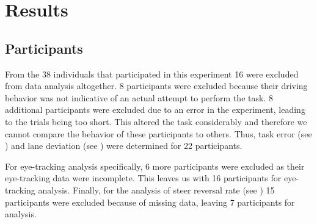 
\section{Results}\label{sec:results}
\subsection{Participants}
From the 38 individuals that participated in this experiment 16 were excluded from data analysis altogether.
8 participants were excluded because their driving behavior was not indicative of an actual attempt to perform the task.
8 additional participants were excluded due to an error in the experiment, leading to the trials being too short.
This altered the task considerably and therefore we cannot compare the behavior of these participants to others.
Thus, task error (see \citealp{DeMooij2021}) and lane deviation (see \citealp{Kelapanda2021}) were determined for 22 participants. 

For eye-tracking analysis specifically, 6 more participants were excluded as their eye-tracking data were incomplete. 
This leaves us with 16 participants for eye-tracking analysis.
Finally, for the analysis of steer reversal rate (see \citealp{Kelapanda2021}) 15 participants were excluded because of missing data, leaving 7 participants for analysis.

